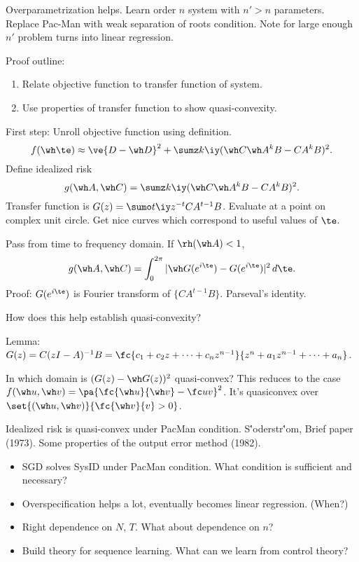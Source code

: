 Overparametrization helps. Learn order $n$ system with $n'>n$ parameters. Replace Pac-Man with weak separation of roots condition.
Note for large enough $n'$ problem turns into linear regression. 

Proof outline:
\begin{enumerate}
\item
Relate objective function to transfer function of system.
\item
Use properties of transfer function to show quasi-convexity.
\end{enumerate}
First step: Unroll objective function using definition.
$$
f(\wh \te) \approx \ve{D-\wh D}^2 + \sumz k\iy (\wh C\wh A^k B - CA^k B)^2.
$$
Define idealized risk
$$
g(\wh A, \wh C) = \sumz k\iy (\wh C\wh A^k B - CA^k B)^2.
$$
Transfer function is $G(z) = \sumo t\iy z^{-t} CA^{t-1}B$.
Evaluate at a point on complex unit circle. Get nice curves which correspond to useful values of $\te$.

Pass from time to frequency domain. If $\rh(\wh A)<1$,
$$
g(\wh A, \wh C) = \int_0^{2\pi} |\wh G(e^{i\te}) - G(e^{i\te})|^2\,d\te.
$$
Proof: $G(e^{i\te})$ is Fourier transform of $\{CA^{t-1}B\}$. Parseval's identity.


How does this help establish quasi-convexity?

Lemma: $G(z) = C(zI-A)^{-1}B = \fc{c_1+c_2z+\cdots +c_nz^{n-1}}{z^n + a_1z^{n-1}+\cdots +a_n}$.

In which domain is $(G(z)-\wh G(z))^2$ quasi-convex?
This reduces to the case $f(\wh u, \wh v) = \pa{\fc{\wh u}{\wh v}-\fc uv}^2$. 
It's quasiconvex over $\set{(\wh u,\wh v)}{\fc{\wh v}{v}>0}$. 

Idealized risk is quasi-convex under PacMan condition. S\''oderstr\''om, Brief paper (1973). Some properties of the output error method (1982). 

\begin{itemize}
\item
SGD solves SysID under PacMan condition. What condition is sufficient and necessary?
\item
Overspecification helps a lot, eventually becomes linear regression. (When?)
\item
Right dependence on $N$, $T$. What about dependence on $n$?
\item
Build theory for sequence learning. What can we learn from control theory?
\end{itemize}

